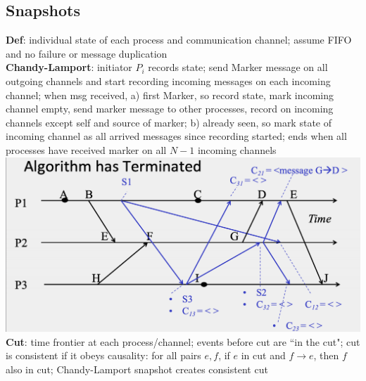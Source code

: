 \documentclass{article}
\begin{document}
\begin{multicols*}{3}
\section{Snapshots}
\textbf{Def}: individual state of each process and communication channel; assume FIFO and no failure or message duplication \\
\textbf{Chandy-Lamport}: initiator $P_i$ records state; send Marker message on all outgoing channels and start recording incoming messages on each incoming channel; when msg received, a) first Marker, so record state, mark incoming channel empty, send marker message to other processes, record on incoming channels except self and source of marker; b) already seen, so mark state of incoming channel as all arrived messages since recording started; ends when all processes have received marker on all $N-1$ incoming channels \\
\includegraphics[width=\columnwidth]{chandylamport.png}
\textbf{Cut}: time frontier at each process/channel; events before cut are ``in the cut"; cut is consistent if it obeys causality: for all pairs $e,f$, if $e$ in cut and $f \rightarrow e$, then $f$ also in cut; Chandy-Lamport snapshot creates consistent cut


\end{multicols*}
\end{document}
